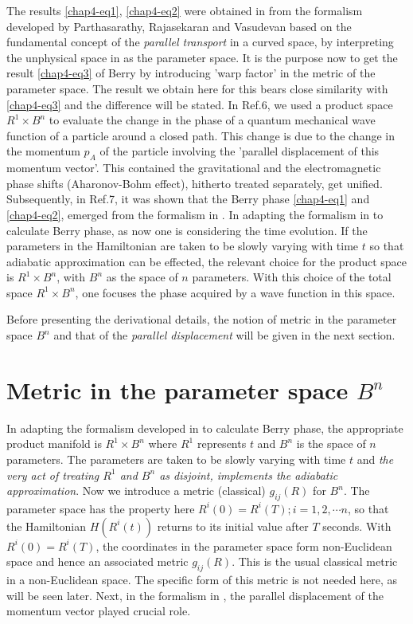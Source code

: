 The results  \eqref{chap4-eq1}, \eqref{chap4-eq2} were obtained in \cite{key7} from the formalism developed by Parthasarathy, Rajasekaran and  Vasudevan \cite{key6} based on the fundamental concept of the {\it{parallel transport}} in a curved space, by interpreting  the unphysical space in \cite{key6} as the parameter space. It is the purpose now to get the result \eqref{chap4-eq3} of Berry \cite{key5}  by introducing 'warp factor' in the metric of the parameter space. The result we obtain here for  this bears close similarity with \eqref{chap4-eq3} and the difference will be stated. In Ref.6, we used a product space $R^1 \times B^n$ to evaluate the change in the phase of a quantum mechanical wave function of a particle around a  closed path. This change is due to the change in the momentum $p_A$ of the particle involving the 'parallel  displacement of this momentum vector'. This contained the gravitational and the electromagnetic phase shifts  (Aharonov-Bohm effect), hitherto treated separately, get unified. Subsequently, in Ref.7, it was shown that the  Berry phase \eqref{chap4-eq1} and \eqref{chap4-eq2}, emerged from the formalism in \cite{key6}. In adapting the formalism in \cite{key6} to calculate Berry phase,  as now one is considering the time evolution. If  the parameters in the Hamiltonian are taken to be slowly varying with time $t$ so that adiabatic approximation  can be effected, the relevant choice for the product space is $R^1\times B^n$, with $B^n$ as the space of $n$  parameters. With this choice of the total space $R^1\times B^n$, one focuses the phase acquired by a wave function  in this space. 

Before presenting the derivational details, the notion of metric in the parameter space $B^n$ and that of the  {\textit{parallel displacement}} will be given in the next section. 

\section{Metric in the parameter space $B^n$}\label{chap4-sec2}

In adapting the formalism developed in \cite{key6} to calculate Berry phase, the appropriate product manifold is $R^1  \times B^n$ where $R^1$ represents $t$ and $B^n$ is the space of $n$ parameters. The parameters are taken to be  slowly varying with time $t$ and {\it{the very act of treating $R^1$ and $B^n$ as disjoint, implements the  adiabatic approximation}}. Now we introduce a metric (classical) $g_{ij}(R)$ for $B^n$. The parameter space has  the property here $R^i(0)=R^i(T); i=1,2,\cdots n$, so that the Hamiltonian $H(R^i(t))$ returns to its initial value  after $T$ seconds. With $R^i(0)=R^i(T)$, the coordinates in the parameter space form non-Euclidean space and hence  an associated metric $g_{ij}(R)$. This is the usual classical metric in a non-Euclidean space. The specific form  of this metric is not needed here, as will be seen later.  Next, in the formalism in \cite{key6}, the parallel displacement of the momentum vector played crucial role.  
 
